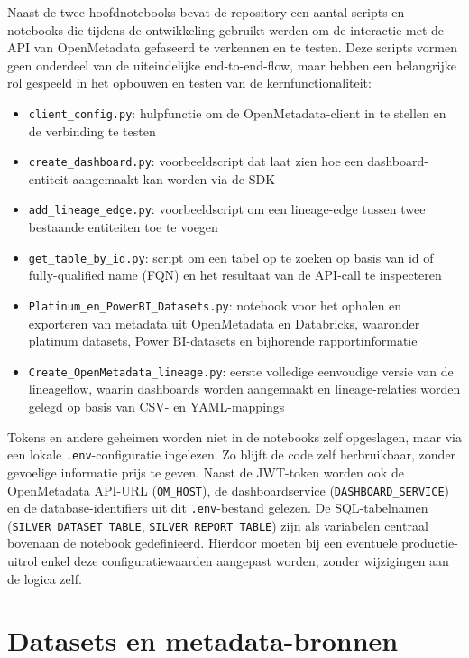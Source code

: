 Naast de twee hoofdnotebooks bevat de repository een aantal scripts en notebooks die tijdens de ontwikkeling gebruikt werden om de interactie met de API van OpenMetadata gefaseerd te verkennen en te testen. Deze scripts vormen geen onderdeel van de uiteindelijke end-to-end-flow, maar hebben een belangrijke rol gespeeld in het opbouwen en testen van de kernfunctionaliteit:
\begin{itemize}
	\item \texttt{client\_config.py}: hulpfunctie om de OpenMetadata-client in te stellen en de verbinding te testen
	\item \texttt{create\_dashboard.py}: voorbeeldscript dat laat zien hoe een dash\-board-en\-ti\-teit aangemaakt kan worden via de SDK
	\item \texttt{add\_lineage\_edge.py}: voorbeeldscript om een lineage-edge tussen twee bestaande entiteiten toe te voegen
	\item \texttt{get\_table\_by\_id.py}: script om een tabel op te zoeken op basis van id of fully-qualified name (FQN) en het resultaat van de API-call te inspecteren
	\item \texttt{Platinum\_en\_PowerBI\_Datasets.py}: notebook voor het ophalen en exporteren van metadata uit OpenMetadata en Databricks, waaronder platinum datasets, Power BI-datasets en bijhorende rapportinformatie
	\item \texttt{Create\_OpenMetadata\_lineage.py}: eerste volledige eenvoudige versie van de lineageflow, waarin dashboards worden aangemaakt en lineage-relaties worden gelegd op basis van CSV- en YAML-mappings
\end{itemize}

Tokens en andere geheimen worden niet in de notebooks zelf opgeslagen, maar via een lokale \texttt{.env}-configuratie ingelezen. Zo blijft de code zelf herbruikbaar, zonder gevoelige informatie prijs te geven. Naast de JWT-token worden ook de OpenMetadata API-URL (\texttt{OM\_HOST}), de dashboardservice (\texttt{DASHBOARD\_SERVICE}) en de database-identifiers uit dit \texttt{.env}-bestand gelezen. De SQL-tabelnamen (\texttt{SILVER\_DATASET\_TABLE}, \texttt{SILVER\_REPORT\_TABLE}) zijn als variabelen centraal bovenaan de notebook gedefinieerd. Hierdoor moeten bij een eventuele productie-uitrol enkel deze configuratiewaarden aangepast worden, zonder wijzigingen aan de logica zelf.\\

\section{Datasets en metadata-bronnen}

